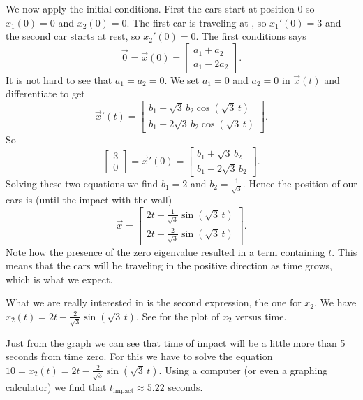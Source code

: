 \begin{example}
We now apply the initial conditions.  First the cars start at position 0
so $x_1 (0) = 0$ and $x_2(0) = 0$.  The first car is traveling at
,
so $x_1'(0) = 3$ and the second car starts at rest, so $x_2'(0) = 0$.
The first conditions says
\begin{equation*}
\vec{0} = \vec{x}(0) = 
\begin{bmatrix}
a_1 + a_2 \\
a_1 - 2 a_2 
\end{bmatrix} .
\end{equation*}
It is not hard to see that $a_1 = a_2 = 0$.  We set $a_1=0$
and $a_2=0$ in $\vec{x}(t)$
and differentiate to get
\begin{equation*}
{\vec{x}}'(t)
=
\begin{bmatrix}
b_1 + \sqrt{3} \, b_2 \cos ( \sqrt{3} \, t ) \\
b_1 - 2 \sqrt{3} \, b_2 \cos ( \sqrt{3} \, t )
\end{bmatrix} .
\end{equation*}
So
\begin{equation*}
\begin{bmatrix} 3 \\ 0 \end{bmatrix} = 
{\vec{x}}'(0)
=
\begin{bmatrix}
b_1 + \sqrt{3} \, b_2 \\
b_1 - 2 \sqrt{3} \, b_2 
\end{bmatrix} .
\end{equation*}
Solving these two equations we
find $b_1 = 2$ and $b_2 =
\frac{1}{\sqrt{3}}$.  Hence the position of our cars is
(until the impact with the wall)
\begin{equation*}
\vec{x} = 
\begin{bmatrix}
2 t + \frac{1}{\sqrt{3}} \sin ( \sqrt{3} \, t ) \\
2 t - \frac{2}{\sqrt{3}} \sin ( \sqrt{3} \, t )
\end{bmatrix} .
\end{equation*}
Note how the presence of the zero eigenvalue resulted in a term containing $t$.
This means that the cars will be traveling in the positive direction as
time grows, which is what we expect.


What we are really interested in is the second expression, the one for $x_2$.
We have $x_2(t) = 
2 t - \frac{2}{\sqrt{3}} \sin ( \sqrt{3} \, t)$.  See 
for the plot of $x_2$ versus time.

Just from the graph we can see that time of impact will be a little
more than 5 seconds from time zero.  For this we have to solve
the equation $10 = x_2(t) = 2 t - \frac{2}{\sqrt{3}} \sin ( \sqrt{3} \,
t)$.
Using a computer (or even a graphing calculator)
we find that $t_{\text{impact}} \approx 5.22$ seconds.


\end{example}
